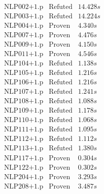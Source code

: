 \documentclass[a4paper,11pt]{report}
\theoremstyle{definition}
\theoremstyle{definition}
\theoremstyle{definition}
\theoremstyle{definition}
\theoremstyle{definition}
\theoremstyle{definition}
\theoremstyle{definition}
\begin{document}
\begin{minipage}{0.45\textwidth}
\[\begin{matrix}
			\text{NLP002+1.p}&\text{Refuted}& 14.428 s\\
			\text{NLP003+1.p}&\text{Refuted}& 14.224 s\\
			\text{NLP004+1.p}&\text{Proven}& 4.340 s\\
			\text{NLP007+1.p}&\text{Proven}& 4.476 s\\
			\text{NLP009+1.p}&\text{Proven}& 4.150 s\\
			\text{NLP011+1.p}&\text{Proven}& 4.546 s\\
			\text{NLP104+1.p}&\text{Refuted}& 1.138 s\\
			\text{NLP105+1.p}&\text{Refuted}& 1.216 s\\
			\text{NLP106+1.p}&\text{Refuted}& 1.216 s\\
			\text{NLP107+1.p}&\text{Refuted}& 1.241 s\\
			\text{NLP108+1.p}&\text{Refuted}& 1.088 s\\
			\text{NLP109+1.p}&\text{Refuted}& 1.178 s\\
			\text{NLP110+1.p}&\text{Refuted}& 1.068 s\\
			\text{NLP111+1.p}&\text{Refuted}& 1.095 s\\
			\text{NLP112+1.p}&\text{Refuted}& 1.112 s\\
			\text{NLP113+1.p}&\text{Refuted}& 1.380 s\\
			\text{NLP117+1.p}&\text{Proven}& 0.304 s\\
			\text{NLP122+1.p}&\text{Proven}& 0.302 s\\
			\text{NLP204+1.p}&\text{Proven}& 3.293 s\\
			\text{NLP208+1.p}&\text{Proven}& 3.487 s\\
		\end{matrix}\]
	\end{minipage}
\end{document}
